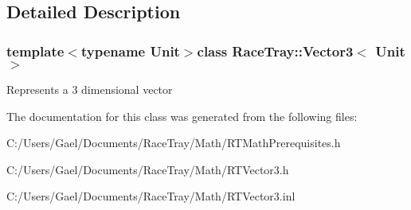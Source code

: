 \subsection{Detailed Description}
\subsubsection*{template$<$typename Unit$>$class Race\-Tray\-::\-Vector3$<$ Unit $>$}

Represents a 3 dimensional vector 

The documentation for this class was generated from the following files\-:\begin{DoxyCompactItemize}
\item 
C\-:/\-Users/\-Gael/\-Documents/\-Race\-Tray/\-Math/R\-T\-Math\-Prerequisites.\-h\item 
C\-:/\-Users/\-Gael/\-Documents/\-Race\-Tray/\-Math/R\-T\-Vector3.\-h\item 
C\-:/\-Users/\-Gael/\-Documents/\-Race\-Tray/\-Math/R\-T\-Vector3.\-inl\end{DoxyCompactItemize}
